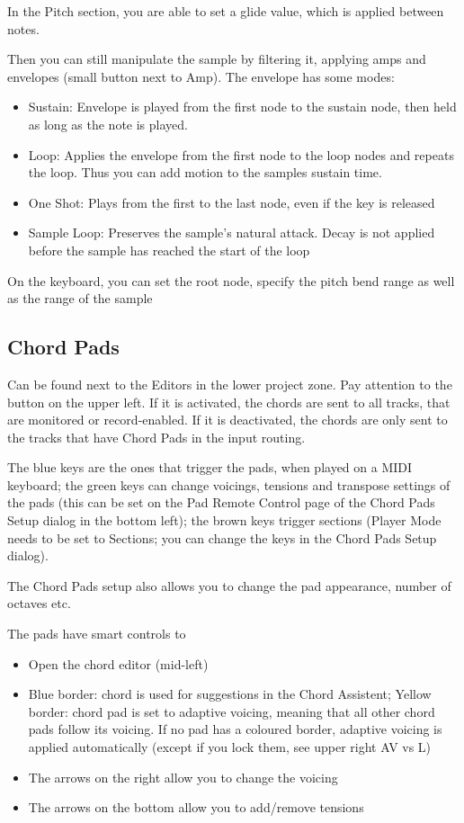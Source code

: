 \documentclass[10pt]{article}
\begin{document}
In the Pitch section, you are able to set a glide value, which is applied between notes.

Then you can still manipulate the sample by filtering it, applying amps and envelopes (small button next to Amp). The envelope has some modes:

\begin{itemize}
	\item Sustain: Envelope is played from the first node to the sustain node, then held as long as the note is played.
	\item Loop: Applies the envelope from the first node to the loop nodes and repeats the loop. Thus you can add motion to the samples sustain time.
	\item One Shot: Plays from the first to the last node, even if the key is released
	\item Sample Loop: Preserves the sample's natural attack. Decay is not applied before the sample has reached the start of the loop
\end{itemize}

On the keyboard, you can set the root node, specify the pitch bend range as well as the range of the sample

\subsection{Chord Pads}

Can be found next to the Editors in the lower project zone. Pay attention to the button on the upper left. If it is activated, the chords are sent to all tracks, that are monitored or record-enabled. If it is deactivated, the chords are only sent to the tracks that have Chord Pads in the input routing.

The blue keys are the ones that trigger the pads, when played on a MIDI keyboard; the green keys can change voicings, tensions and transpose settings of the pads (this can be set on the Pad Remote Control page of the Chord Pads Setup dialog in the bottom left); the brown keys trigger sections (Player Mode needs to be set to Sections; you can change the keys in the Chord Pads Setup dialog).

The Chord Pads setup also allows you to change the pad appearance, number of octaves etc.

The pads have smart controls to
\begin{itemize}
	\item Open the chord editor (mid-left)
	\item Blue border: chord is used for suggestions in the Chord Assistent; Yellow border: chord pad is set to adaptive voicing, meaning that all other chord pads follow its voicing. If no pad has a coloured border, adaptive voicing is applied automatically (except if you lock them, see upper right AV vs L)
	\item The arrows on the right allow you to change the voicing
	\item The arrows on the bottom allow you to add/remove tensions
\end{itemize}
\end{document}
